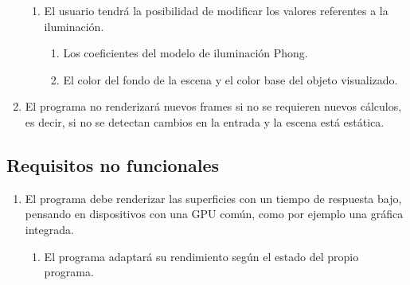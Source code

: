\begin{enumerate}
\begin{enumerate}
			\item El usuario tendrá la posibilidad de modificar los valores referentes a la iluminación.
			\begin{enumerate}
				\item Los coeficientes del modelo de iluminación Phong.
				\item El color del fondo de la escena y el color base del objeto visualizado.
			\end{enumerate}
		\end{enumerate}
			
		\item El programa no renderizará nuevos frames si no se requieren nuevos cálculos, es decir, si no se detectan cambios en la entrada y la escena está estática.
	\end{enumerate}

	\subsection*{Requisitos no funcionales}
	\begin{enumerate}
		\item El programa debe renderizar las superficies con un tiempo de respuesta bajo, pensando en dispositivos con una GPU común, como por ejemplo una gráfica integrada.
		\begin{enumerate}
			\item El programa adaptará su rendimiento según el estado del propio programa.
		\end{enumerate}
	\end{enumerate}

